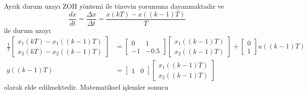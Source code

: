 Ayrık durum uzayı ZOH yöntemi ile türevin yorumuna dayanmaktadır ve 
\begin{equation}
    \frac{dx}{dt}=\frac{\Delta x}{\Delta t}=\frac{x(kT)-x((k-1)T)}{T}
\end{equation}
ile durum uzayı
\begin{equation}
    \begin{split}
        \frac{1}{T}\begin{bmatrix}
            x_1(kT)-x_1((k-1)T)\\
            x_2(kT)-x_2((k-1)T)
        \end{bmatrix}&=
        \begin{bmatrix}
            0& 1\\
            -1& -0.5
        \end{bmatrix}\begin{bmatrix}
            x_1((k-1)T)\\
            x_2((k-1)T)
        \end{bmatrix}+\begin{bmatrix}
            0\\
            1
        \end{bmatrix}u((k-1)T)\\
        y((k-1)T)&=\begin{bmatrix}
            1&0 
        \end{bmatrix}\begin{bmatrix}
            x_1((k-1)T)\\
            x_2((k-1)T)
        \end{bmatrix}
    \end{split}
\end{equation}
olarak elde edilmektedir. Matematiksel işlemler sonucu
